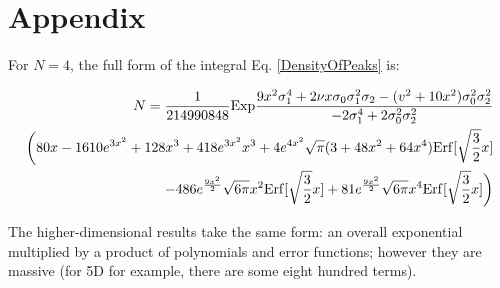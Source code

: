 \documentclass[12pt]{article}
\begin{document}
\section{Appendix}
For $N=4$, the full form of the integral Eq. \ref{DensityOfPeaks} is:

\begin{equation}
\begin{split}
N = \frac{1}{214990848} \mathrm{Exp}\frac{9x^2\sigma_1^4 + 2\nu x \sigma_0 \sigma_1^2 \sigma_2 - (v^2+10x^2)\sigma_0^2\sigma_2^2}{-2\sigma_1^4+2\sigma_0^2\sigma_2^2}\\\bigg{(}80x - 1610e^{3x^2}+128x^3+418e^{3x^2}x^3+4e^{4x^2}\sqrt{\pi}(3+48x^2+64x^4)\mathrm{Erf}[\sqrt{\frac{3}{2}}x]\\
-486e^{\frac{9x^2}{2}}\sqrt{6\pi}x^2\mathrm{Erf}[\sqrt{\frac{3}{2}}x]+81e^{\frac{9x^2}{2}}\sqrt{6\pi}x^4\mathrm{Erf}[\sqrt{\frac{3}{2}}x]\bigg{)}
\end{split}
\end{equation}

The higher-dimensional results take the same form: an overall exponential multiplied by a product of polynomials and error functions; however they are massive (for 5D for example, there are some eight hundred terms).
\end{document}
